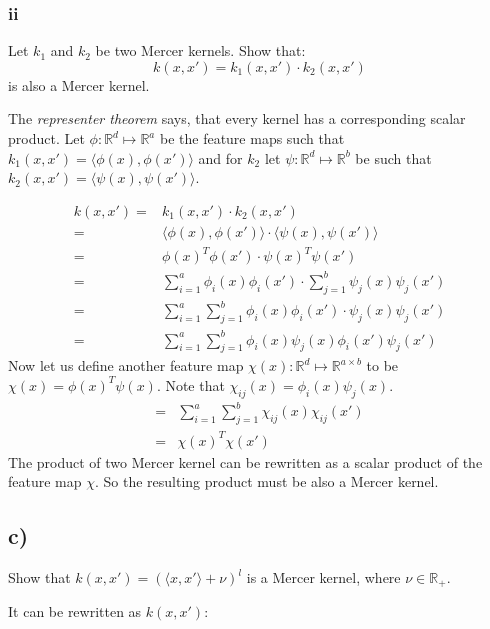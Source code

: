 \documentclass{article}
\newcommand{\R}[0]{\mathbb{R}}
\begin{document}
\subsubsection*{ii}

Let $k_1$ and $k_2$ be two Mercer kernels. Show that:
\begin{equation}
    k(x, x') = k_1(x, x') \cdot k_2(x, x')
\end{equation}
is also a Mercer kernel.


The \emph{representer theorem} says, that every kernel has a corresponding
scalar product.
Let $\phi : \R^d \mapsto \R^a $ be the feature maps such that $k_1(x, x') = \langle{}\phi(x),\phi(x')\rangle{}$ and
for $k_2$ let  $\psi : \R^d \mapsto \R^b$ be such that $k_2(x, x') = \langle{}\psi(x),\psi(x')\rangle{}$.

\begin{align}
    k(x, x') = &k_1(x, x') \cdot k_2(x, x')\\
    = & \langle{}\phi(x), \phi(x')\rangle{} \cdot \langle{}\psi(x), \psi(x')\rangle{}\\
    = & \phi(x)^T \phi(x') \cdot \psi(x)^T \psi(x')\\
    = & \sum_{i=1}^a \phi_i(x) \phi_i(x') \cdot \sum_{j=1}^b \psi_j(x) \psi_j(x')\\
    = & \sum_{i=1}^a \sum_{j=1}^b \phi_i(x) \phi_i(x') \cdot  \psi_j(x) \psi_j(x')\\
    = & \sum_{i=1}^a \sum_{j=1}^b \phi_i(x)  \psi_j(x) \phi_i(x') \psi_j(x')
\end{align}
Now let us define another feature map
$\chi(x) : \R^d \mapsto \R^{a \times b}$ to be $\chi(x) = \phi(x)^T \psi(x)$.
Note that $\chi_{ij}(x) = \phi_i(x) \psi_j(x)$.
\begin{align}
    = & \sum_{i=1}^a \sum_{j=1}^b \chi_{ij}(x)  \chi_{ij}(x') \\
    = & \chi(x)^T  \chi(x')
\end{align}
The product of two Mercer kernel can be rewritten as a scalar product of
the feature map $\chi$. So the resulting product must be also a Mercer kernel.

\subsection*{c)}

Show that $ k(x, x') = (\langle{}x, x'\rangle{} + \nu)^l$ is a Mercer kernel, where $\nu \in \R_+$.

It can be rewritten as $k(x, x')$:
\end{document}
